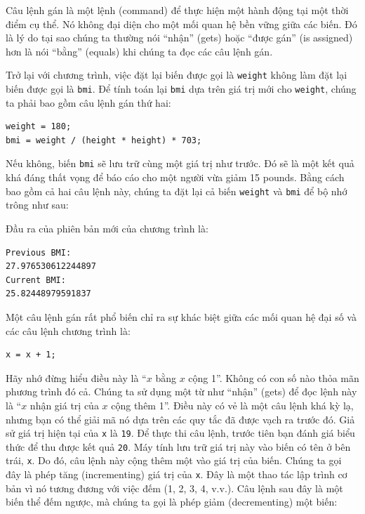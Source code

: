 Câu lệnh gán là một lệnh (command) để thực hiện một hành động tại một
thời điểm cụ thể. Nó không đại diện cho một mối quan hệ bền vững giữa
các biến. Đó là lý do tại sao chúng ta thường nói ``nhận'' (gets) hoặc
``được gán'' (is assigned) hơn là nói ``bằng'' (equals) khi chúng ta đọc
các câu lệnh gán.

Trở lại với chương trình, việc đặt lại biến được gọi là \texttt{weight}
không làm đặt lại biến được gọi là \texttt{bmi}. Để tính toán lại
\texttt{bmi} dựa trên giá trị mới cho \texttt{weight}, chúng ta phải bao
gồm câu lệnh gán thứ hai:

\begin{verbatim}
weight = 180;
bmi = weight / (height * height) * 703;
\end{verbatim}

Nếu không, biến \texttt{bmi} sẽ lưu trữ cùng một giá trị như trước. Đó
sẽ là một kết quả khá đáng thất vọng để báo cáo cho một người vừa giảm
15 pounds. Bằng cách bao gồm cả hai câu lệnh này, chúng ta đặt lại cả
biến \texttt{weight} và \texttt{bmi} để bộ nhớ trông như sau:

Đầu ra của phiên bản mới của chương trình là:

\begin{verbatim}
Previous BMI: 
27.976530612244897 
Current BMI: 
25.82448979591837
\end{verbatim}

Một câu lệnh gán rất phổ biến chỉ ra sự khác biệt giữa các mối quan hệ
đại số và các câu lệnh chương trình là:

\begin{verbatim}
x = x + 1;
\end{verbatim}

Hãy nhớ đừng hiểu điều này là ``\(x\) bằng \(x\) cộng 1''. Không có con
số nào thỏa mãn phương trình đó cả. Chúng ta sử dụng một từ như ``nhận''
(gets) để đọc lệnh này là ``\(x\) nhận giá trị của \(x\) cộng thêm 1''.
Điều này có vẻ là một câu lệnh khá kỳ lạ, nhưng bạn có thể giải mã nó
dựa trên các quy tắc đã được vạch ra trước đó. Giả sử giá trị hiện tại
của \texttt{x} là \texttt{19}. Để thực thi câu lệnh, trước tiên bạn đánh
giá biểu thức để thu được kết quả \texttt{20}. Máy tính lưu trữ giá trị
này vào biến có tên ở bên trái, \texttt{x}. Do đó, câu lệnh này cộng
thêm một vào giá trị của biến. Chúng ta gọi đây là phép tăng
(incrementing) giá trị của \texttt{x}. Đây là một thao tác lập trình cơ
bản vì nó tương đương với việc đếm (1, 2, 3, 4, v.v.). Câu lệnh sau đây
là một biến thể đếm ngược, mà chúng ta gọi là phép giảm (decrementing)
một biến:

